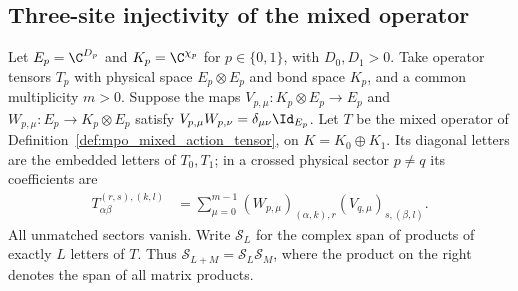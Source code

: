 
\subsection{Three-site injectivity of the mixed operator}
\label{sec:mpo_mixed_normality}

Let $E_p=\C^{D_p}$ and $K_p=\C^{\chi_p}$ for $p\in\{0,1\}$,
with $D_0,D_1>0$. Take operator tensors $T_p$ with physical space
$E_p\otimes E_p$ and bond space $K_p$, and a common multiplicity
$m>0$. Suppose the maps $V_{p,\mu}:K_p\otimes E_p\to E_p$ and
$W_{p,\mu}:E_p\to K_p\otimes E_p$ satisfy
$V_{p,\mu}W_{p,\nu}=\delta_{\mu\nu}\Id_{E_p}$.
Let $T$ be the mixed operator of
Definition~\ref{def:mpo_mixed_action_tensor}, on $K=K_0\oplus K_1$.
Its diagonal letters are the embedded letters of $T_0,T_1$; in a
crossed physical sector $p\ne q$ its coefficients are
\begin{align}
    T^{(r,s),(k,l)}_{\alpha\beta}
     & =\sum_{\mu=0}^{m-1}
    (W_{p,\mu})_{(\alpha,k),r}(V_{q,\mu})_{s,(\beta,l)}.
    \label{eq:mpo_mix_normal_cross}
\end{align}
All unmatched sectors vanish. Write $\mathcal S_L$ for the complex
span of products of exactly $L$ letters of $T$. Thus
$\mathcal S_{L+M}=\mathcal S_L\mathcal S_M$, where the product on the
right denotes the span of all matrix products.

